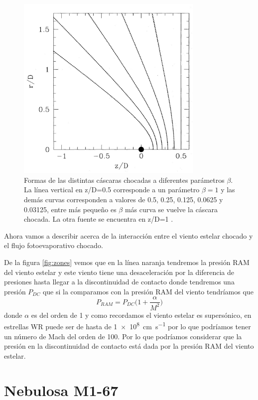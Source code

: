 \documentclass{book}
\begin{document}
\begin{figure}[h]
    \centering    \includegraphics[width=0.8\textwidth]{images Chapter 2/C2_Canto2.jpg}
    \caption{Formas de las distintas cáscaras chocadas a diferentes parámetros $\beta$. La línea vertical en z/D=0.5 corresponde a un parámetro $\beta=1$ y las demás curvas corresponden a valores de 0.5, 0.25, 0.125, 0.0625 y 0.03125, entre más pequeño es $\beta$ más curva se vuelve la cáscara chocada. La otra fuente se encuentra en z/D=1 \citep{Canto:1996}.}
    \label{fig:Canto2}
\end{figure}

Ahora vamos a describir acerca de la interacción entre el viento estelar chocado y el flujo fotoevaporativo chocado. 

De la figura \ref{fig:zones} vemos que en la línea naranja tendremos la presión RAM del viento estelar y este viento tiene una desaceleración por la diferencia de presiones hasta llegar a la discontinuidad de contacto donde tendremos una presión $P_{DC}$ que si la comparamos con la presión RAM del viento tendríamos que
\[P_{RAM}=P_{DC}\Big(1+\frac{\alpha}{M^2}\Big)\] donde $\alpha$ es del orden de 1 y como recordamos el viento estelar es supersónico, en estrellas WR puede ser de hasta de \SI{1e8}{cm.s^{-1}} por lo que podríamos tener un número de Mach del orden de 100. Por lo que podríamos considerar que la presión en la discontinuidad de contacto está dada por la presión RAM del viento estelar.


\chapter{Nebulosa M1-67}
\end{document}
